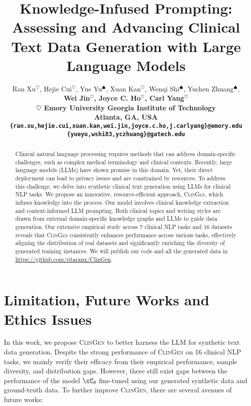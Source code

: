 \documentclass{article} %
\title{Knowledge-Infused Prompting: Assessing and Advancing Clinical Text Data Generation with Large Language Models}
\author{Ran Xu$^{\heartsuit}$, Hejie Cui$^{\heartsuit}$, Yue Yu{$^\spadesuit$}, Xuan Kan$^{\heartsuit}$, Wenqi Shi{$^\spadesuit$}, Yuchen Zhuang{$^\spadesuit$}, \\ \bf Wei Jin$^{\heartsuit}$, Joyce C. Ho$^{\heartsuit}$, Carl Yang$^{\heartsuit}$ \\
${\heartsuit}$ Emory University \quad {$^\spadesuit$} Georgia Institute of Technology \\
Atlanta, GA, USA \\
\texttt{\{ran.xu,hejie.cui,xuan.kan,wei.jin,joyce.c.ho,j.carlyang\}@emory.edu} \\
\texttt{\{yueyu,wshi83,yczhuang\}@gatech.edu}
}
\newcommand{\ours}{\textsc{ClinGen}\xspace}
\begin{document}
\maketitle

\begin{abstract}
Clinical natural language processing requires methods that can address domain-specific challenges, such as complex medical terminology and clinical contexts. 
Recently, large language models (LLMs) have shown promise in this domain. Yet, their direct deployment can lead to privacy issues and are constrained by resources. 
To address this challenge, we delve into synthetic clinical text generation using LLMs for clinical NLP tasks. We propose an innovative, resource-efficient approach, {\ours}, which infuses knowledge into the process. Our model involves clinical knowledge extraction and context-informed LLM prompting. Both clinical topics and writing styles are drawn from external domain-specific knowledge graphs and LLMs to guide data generation. 
Our extensive empirical study across 7 clinical NLP tasks and 16 datasets reveals that {\ours} consistently enhances performance across various tasks, effectively aligning the distribution of real datasets and significantly enriching the diversity of generated training instances. We will publish our code and all the generated data in \url{https://github.com/ritaranx/ClinGen}.
\end{abstract}















\clearpage
\appendix
\section{Limitation, Future Works and Ethics Issues}
In this work, we propose {\ours} to better harness the LLM for synthetic text data generation. 
Despite the strong performance of {\ours} on 16 clinical NLP tasks, we mainly verify their efficacy from their empirical performance, sample diversity, and distribution gaps. 
However, there still exist gaps between the performance of the model $\cC_\theta$ fine-tuned using our generated synthetic data and ground-truth data. 
To further improve {\ours}, there are several avenues of future works:
\end{document}
